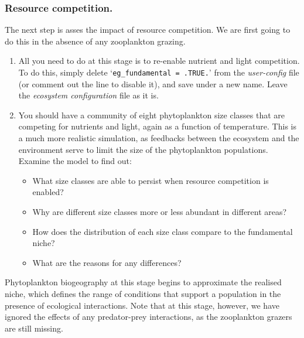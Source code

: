 \newpage
%
\subsubsection*{Resource competition.}
\vspace{1mm}

The next step is asses the impact of resource competition. We are first going to do this in the absence of any zooplankton grazing.

\begin{enumerate}[noitemsep]
\vspace{1mm}
\item All you need to do at this stage is to re-enable nutrient and light competition. To do this, simply delete `\texttt{\small eg\_fundamental~=~.TRUE.}' from the \textit{user-config} file (or comment out the line to disable it), and save under a new name. Leave the \textit{ecosystem configuration} file as it is.

\vspace{1mm}
\item You should have a community of eight phytoplankton size classes that are competing for nutrients and light, again as a function of temperature. This is a much more realistic simulation, as feedbacks between the ecosystem and the environment serve to limit the size of the phytoplankton populations. Examine the model to find out:
\vspace{1mm}
\begin{itemize}
\item What size classes are able to persist when resource competition is enabled?
\item Why are different size classes more or less abundant in different areas?
\item How does the distribution of each size class compare to the fundamental niche?
\item What are the reasons for any differences?
\end{itemize}
\end{enumerate}
\vspace{1mm}

Phytoplankton biogeography at this stage begins to approximate the realised niche, which defines the range of conditions that support a population in the presence of ecological interactions. Note that at this stage, however, we have ignored the effects of any predator-prey interactions, as the zooplankton grazers are still missing.

